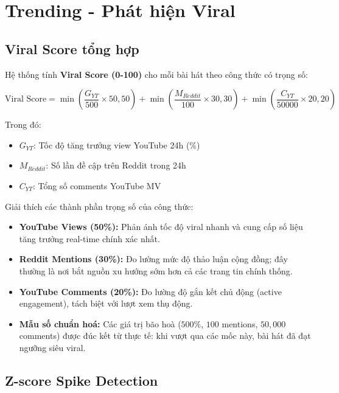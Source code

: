 \documentclass[12pt,a4paper]{report}
\begin{document}
\section{Trending - Phát hiện Viral}

\subsection{Viral Score tổng hợp}

Hệ thống tính \textbf{Viral Score (0-100)} cho mỗi bài hát theo công thức có trọng số:

\begin{equation}
\text{Viral Score} = \min\!\left(\frac{G_{YT}}{500} \times 50, 50\right) + \min\!\left(\frac{M_{Reddit}}{100} \times 30, 30\right) + \min\!\left(\frac{C_{YT}}{50000} \times 20, 20\right)
\label{eq:viral_score}
\end{equation}

Trong đó:
\begin{itemize}
    \item $G_{YT}$: Tốc độ tăng trưởng view YouTube 24h (\%)
    \item $M_{Reddit}$: Số lần đề cập trên Reddit trong 24h
    \item $C_{YT}$: Tổng số comments YouTube MV
\end{itemize}

Giải thích các thành phần trọng số của công thức:
\begin{itemize}[leftmargin=*]
    \item \textbf{YouTube Views (50\%):} Phản ánh tốc độ viral nhanh và cung cấp số liệu tăng trưởng real-time chính xác nhất.
    \item \textbf{Reddit Mentions (30\%):} Đo lường mức độ thảo luận cộng đồng; đây thường là nơi bắt nguồn xu hướng sớm hơn cả các trang tin chính thống.
    \item \textbf{YouTube Comments (20\%):} Đo lường độ gắn kết chủ động (active engagement), tách biệt với lượt xem thụ động.
    \item \textbf{Mẫu số chuẩn hoá:} Các giá trị bão hoà ($500\%$, $100$ mentions, $50{,}000$ comments) được đúc kết từ thực tế: khi vượt qua các mốc này, bài hát đã đạt ngưỡng siêu viral.
\end{itemize}

\subsection{Z-score Spike Detection}
\end{document}
